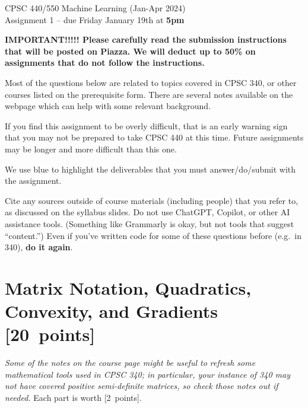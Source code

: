 \documentclass{article}
\newcommand{\ask}[1]{\textcolor{question}{#1}}
\newcommand{\pts}[1]{\textcolor{points}{[#1~points]}}
\newcommand{\meta}[1]{\textcolor{black!60!white}{\emph{#1}}}
\begin{document}
\begin{center}
\Large
CPSC 440/550 Machine Learning (Jan-Apr 2024)\\
Assignment 1 --
due Friday January 19th at \textbf{5pm}
\end{center}



\textbf{IMPORTANT!!!!! Please carefully read the submission instructions that will be posted on Piazza. We will deduct up to 50\% on assignments that do not follow the instructions.}

Most of the questions below are related to topics covered in CPSC 340, or other courses listed on the prerequisite form. There are several notes available on the webpage which can help with some relevant background.

If you find this assignment to be overly difficult, that is an early warning sign that you may not be prepared to take CPSC 440
at this time. Future assignments may be longer and more difficult than this one.

We use \ask{blue} to highlight the deliverables that you must answer/do/submit with the assignment.

Cite any sources outside of course materials (including people) that you refer to,
as discussed on the syllabus slides.
Do not use ChatGPT, Copilot, or other AI assistance tools. (Something like Grammarly is okay, but not tools that suggest ``content.'')
Even if you've written code for some of these questions before (e.g.\ in 340),
\textbf{do it again}.


\clearpage
\section{Matrix Notation, Quadratics, Convexity, and Gradients \pts{20}} \label{q:mat}
\meta{Some of the notes on the course page might be useful to refresh some mathematical tools used in CPSC 340;
in particular, your instance of 340 may not have covered positive semi-definite matrices, so check those notes out if needed.}
Each part is worth \pts{2}.
\end{document}
